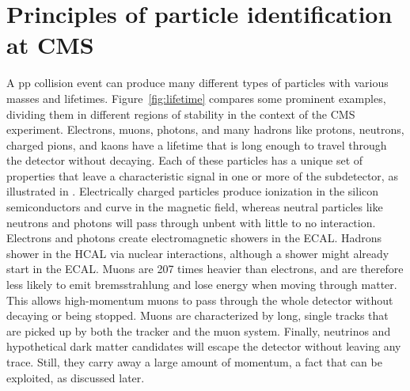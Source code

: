 

\section{Principles of particle identification at CMS} \label{sec:PID}



A pp collision event can produce many different types of particles with various masses and lifetimes.
Figure~\ref{fig:lifetime} compares some prominent examples, dividing them in different regions of stability in the context of the CMS experiment.
Electrons, muons, photons, and many hadrons like protons, neutrons, charged pions, and kaons have a lifetime that is long enough to travel through the detector without decaying.
Each of these particles has a unique set of properties that leave a characteristic signal in one or more of the subdetector, as illustrated in .
Electrically charged particles produce ionization in the silicon semiconductors and curve in the magnetic field, whereas neutral particles like neutrons and photons will pass through unbent with little to no interaction. Electrons and photons create electromagnetic showers in the ECAL. Hadrons shower in the HCAL via nuclear interactions, although a shower might already start in the ECAL.
Muons are 207 times heavier than electrons, and are therefore less likely to emit bremsstrahlung and lose energy when moving through matter. This allows high-momentum muons to pass through the whole detector without decaying or being stopped. Muons are characterized by long, single tracks that are picked up by both the tracker and the muon system.
Finally, neutrinos and hypothetical dark matter candidates will escape the detector without leaving any trace. Still, they carry away a large amount of momentum, a fact that can be exploited, as discussed later.

